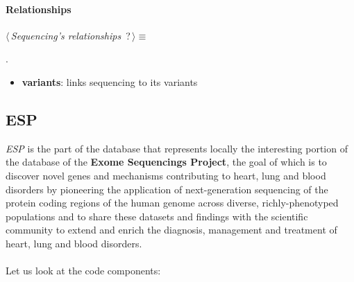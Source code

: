 \newpage

\paragraph{Relationships} 

	\begin{flushleft} \small
\begin{minipage}{\linewidth}\label{scrap11}\raggedright\small
{} $\langle\,${\itshape {Sequencing's relationships}}\nobreak\ {\footnotesize {?}}$\,\rangle\equiv$
\vspace{-1ex}
\begin{list}{}{} \item

                
        {\NWsep}
\end{list}
\vspace{-1.5ex}
\footnotesize
\begin{list}{}{\setlength{\itemsep}{-\parsep}\setlength{\itemindent}{-\leftmargin}}
\item {\NWtxtMacroNoRef}.

\item{}
\end{list}
\end{minipage}\vspace{4ex}
\end{flushleft}
\begin{itemize}
 	\item \textbf{variants}: links sequencing to its variants
\end{itemize}


\subsection{ESP}
\emph{ESP} is the part of the database that represents locally the interesting portion of the database of the \textbf{Exome Sequencings Project}, the goal of which is to discover novel genes and mechanisms contributing to heart, lung and blood disorders by pioneering the application of next-generation sequencing of the protein coding regions of the human genome across diverse, richly-phenotyped populations and to share these datasets and findings with the scientific community to extend and enrich the diagnosis, management and treatment of heart, lung and blood disorders.
\\
\\Let us look at the code components:

